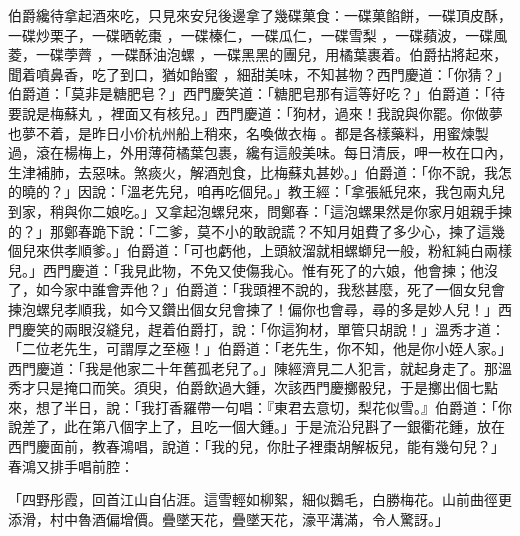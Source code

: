 \begin{showcontents}{}
伯爵纔待拿起酒來吃，只見來安兒後邊拿了幾碟菓食：一碟菓餡餅，一碟頂皮酥，一碟炒栗子，一碟晒乾棗 ，一碟榛仁，一碟瓜仁，一碟雪梨 ，一碟蘋波，一碟風菱，一碟荸薺 ，一碟酥油泡螺 ，一碟黑黑的團兒，用橘葉裹着。伯爵拈將起來，聞着噴鼻香，吃了到口，猶如飴蜜 ，細甜美味，不知甚物？西門慶道：「你猜？」伯爵道：「莫非是糖肥皂？」西門慶笑道：「糖肥皂那有這等好吃？」伯爵道：「待要說是梅蘇丸 ，裡面又有核兒。」西門慶道：「狗材，過來！我說與你罷。你做夢也夢不着，是昨日小价杭州船上稍來，名喚做衣梅 。都是各樣藥料，用蜜煉製過，滾在楊梅上，外用薄荷橘葉包裹，纔有這般美味。每日清辰，呷一枚在口內，生津補肺，去惡味。煞痰火，解酒剋食，比梅蘇丸甚妙。」伯爵道：「你不說，我怎的曉的？」因說：「溫老先兒，咱再吃個兒。」教王經：「拿張紙兒來，我包兩丸兒到家，稍與你二娘吃。」又拿起泡螺兒來，問鄭春：「這泡螺果然是你家月姐親手揀的？」那鄭春跪下說：「二爹，莫不小的敢說謊？不知月姐費了多少心，揀了這幾個兒來供孝順爹。」伯爵道：「可也虧他，上頭紋溜就相螺螄兒一般，粉紅純白兩樣兒。」西門慶道：「我見此物，不免又使傷我心。惟有死了的六娘，他會揀；他沒了，如今家中誰會弄他？」伯爵道：「我頭裡不說的，我愁甚麼，死了一個女兒會揀泡螺兒孝順我，如今又鑽出個女兒會揀了！偏你也會尋，尋的多是妙人兒！」西門慶笑的兩眼沒縫兒，趕着伯爵打，說：「你這狗材，單管只胡說！」溫秀才道：「二位老先生，可謂厚之至極！」伯爵道：「老先生，你不知，他是你小姪人家。」西門慶道：「我是他家二十年舊孤老兒了。」陳經濟見二人犯言，就起身走了。那溫秀才只是掩口而笑。須臾，伯爵飲過大鍾，次該西門慶擲骰兒，于是擲出個七點來，想了半日，說：「我打香羅帶一句唱：『東君去意切，梨花似雪。』伯爵道：「你說差了，此在第八個字上了，且吃一個大鍾。」于是流沿兒斟了一銀衢花鍾，放在西門慶面前，教春鴻唱，說道：「我的兒，你肚子裡棗胡解板兒，能有幾句兒？」春鴻又排手唱前腔：

「四野彤霞，回首江山自佔涯。這雪輕如柳絮，細似鵝毛，白勝梅花。山前曲徑更添滑，村中魯酒偏增價。疊墜天花，疊墜天花，濠平溝滿，令人驚訝。」


\end{showcontents}
